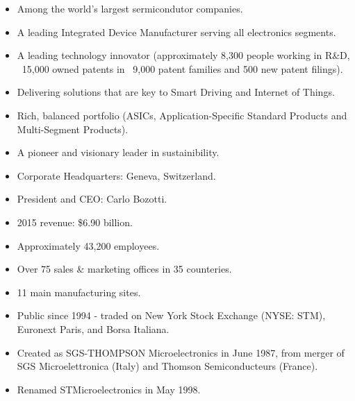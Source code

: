 \begin{itemize}
	\item Among the world's largest sermicondutor companies.
	\item A leading Integrated Device Manufacturer serving all electronics segments.
	\item A leading technology innovator (approximately 8,300 people working in R\&D, ~15,000 owned patents in ~9,000 patent families and 500 new patent filings).
	\item Delivering solutions that are key to Smart Driving and Internet of Things.
	\item Rich, balanced portfolio (ASICs, Application-Specific Standard Products and Multi-Segment Products).
	\item A pioneer and visionary leader in sustainibility.
	\item Corporate Headquarters: Geneva, Switzerland.
	\item President and CEO: Carlo Bozotti.
	\item 2015 revenue: \$6.90 billion.
	\item Approximately 43,200 employees.
	\item Over 75 sales \& marketing offices in 35 counteries.
	\item 11 main manufacturing sites.
	\item Public since 1994 - traded on New York Stock Exchange (NYSE: STM), Euronext Paris, and Borsa Italiana.
	\item Created as SGS-THOMPSON Microelectronics in June 1987, from merger of SGS Microelettronica (Italy) and Thomson Semiconducteurs (France).
	\item Renamed STMicroelectronics in May 1998.
\end{itemize}
